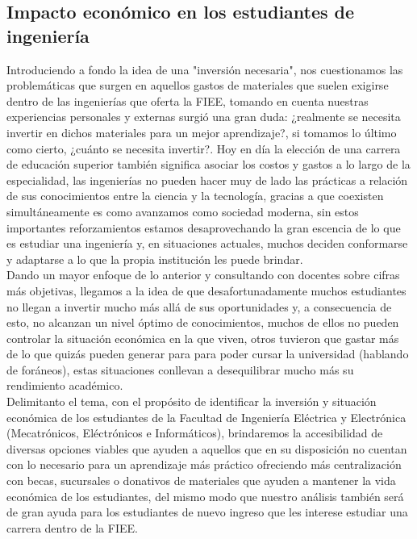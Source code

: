 \documentclass[letterpaper,12pt]{article}
\begin{document}
\newpage
\begin{sloppypar}
\begin{center}
    \section*{Impacto económico en los estudiantes de ingeniería}
\end{center}
Introduciendo a fondo la idea de una "inversión necesaria", nos cuestionamos las problemáticas que surgen en aquellos gastos de materiales que suelen exigirse dentro de las ingenierías que oferta la FIEE, tomando en cuenta nuestras experiencias personales y externas surgió una gran duda: ¿realmente se necesita invertir en dichos materiales para un mejor aprendizaje?, si tomamos lo último como cierto, ¿cuánto se necesita invertir?. Hoy en día la elección de una carrera de educación superior también significa asociar los costos y gastos a lo largo de la especialidad, las ingenierías no pueden hacer muy de lado las prácticas a relación de sus conocimientos entre la ciencia y la tecnología, gracias a que coexisten simultáneamente es como avanzamos como sociedad moderna, sin estos importantes reforzamientos estamos desaprovechando la gran escencia de lo que es estudiar una ingeniería y, en situaciones actuales, muchos deciden conformarse y adaptarse a lo que la propia institución les puede brindar.
\vspace{0.3cm}\\
Dando un mayor enfoque de lo anterior y consultando con docentes sobre cifras más objetivas, llegamos a la idea de que desafortunadamente muchos estudiantes no llegan a invertir mucho más allá de sus oportunidades y, a consecuencia de esto, no alcanzan un nivel óptimo de conocimientos, muchos de ellos no pueden controlar la situación económica en la que viven, otros tuvieron que gastar más de lo que quizás pueden generar para para poder cursar la universidad (hablando de foráneos), estas situaciones conllevan a desequilibrar mucho más su rendimiento académico. 
\vspace{0.3cm}\\
Delimitanto el tema, con el propósito de identificar la inversión y situación económica de los estudiantes de la Facultad de Ingeniería Eléctrica y Electrónica (Mecatrónicos, Eléctrónicos e Informáticos), brindaremos la accesibilidad de diversas opciones viables que ayuden a aquellos que en su disposición no cuentan con lo necesario para un aprendizaje más práctico ofreciendo más centralización con becas, sucursales o donativos de materiales que ayuden a mantener la vida económica de los estudiantes, del mismo modo que nuestro análisis también será de gran ayuda para los estudiantes de nuevo ingreso que les interese estudiar una carrera dentro de la FIEE.

\end{sloppypar}
\end{document}
